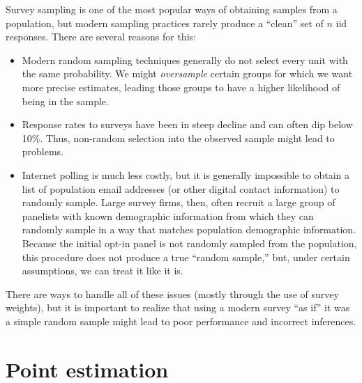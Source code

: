 \documentclass[
  letterpaper,
  DIV=11,
  numbers=noendperiod]{scrreprt}
\theoremstyle{definition}
\theoremstyle{definition}
\theoremstyle{plain}
\theoremstyle{remark}
\begin{document}
\begin{tcolorbox}[enhanced jigsaw, colframe=quarto-callout-warning-color-frame, rightrule=.15mm, colback=white, breakable, opacityback=0, coltitle=black, opacitybacktitle=0.6, arc=.35mm, left=2mm, leftrule=.75mm, toptitle=1mm, colbacktitle=quarto-callout-warning-color!10!white, titlerule=0mm, title=\textcolor{quarto-callout-warning-color}{\faExclamationTriangle}\hspace{0.5em}{Warning}, bottomrule=.15mm, bottomtitle=1mm, toprule=.15mm]

Survey sampling is one of the most popular ways of obtaining samples
from a population, but modern sampling practices rarely produce a
``clean'' set of \(n\) iid responses. There are several reasons for
this:

\begin{itemize}
\item
  Modern random sampling techniques generally do not select every unit
  with the same probability. We might \emph{oversample} certain groups
  for which we want more precise estimates, leading those groups to have
  a higher likelihood of being in the sample.
\item
  Response rates to surveys have been in steep decline and can often dip
  below 10\%. Thus, non-random selection into the observed sample might
  lead to problems.
\item
  Internet polling is much less costly, but it is generally impossible
  to obtain a list of population email addresses (or other digital
  contact information) to randomly sample. Large survey firms, then,
  often recruit a large group of panelists with known demographic
  information from which they can randomly sample in a way that matches
  population demographic information. Because the initial opt-in panel
  is not randomly sampled from the population, this procedure does not
  produce a true ``random sample,'' but, under certain assumptions, we
  can treat it like it is.
\end{itemize}

There are ways to handle all of these issues (mostly through the use of
survey weights), but it is important to realize that using a modern
survey ``as if'' it was a simple random sample might lead to poor
performance and incorrect inferences.

\end{tcolorbox}

\hypertarget{point-estimation}{%
\section{Point estimation}\label{point-estimation}}
\end{document}

